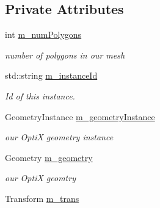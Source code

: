 \subsection*{Private Attributes}
\begin{DoxyCompactItemize}
\item 
\hypertarget{class_opti_x_model_ac229141f93d671f891f85ca5434ffcae}{int \hyperlink{class_opti_x_model_ac229141f93d671f891f85ca5434ffcae}{m\-\_\-num\-Polygons}}\label{class_opti_x_model_ac229141f93d671f891f85ca5434ffcae}

\begin{DoxyCompactList}\small\item\em number of polygons in our mesh \end{DoxyCompactList}\item 
\hypertarget{class_opti_x_model_ad813ee22588786e7344b4f522c646500}{std\-::string \hyperlink{class_opti_x_model_ad813ee22588786e7344b4f522c646500}{m\-\_\-instance\-Id}}\label{class_opti_x_model_ad813ee22588786e7344b4f522c646500}

\begin{DoxyCompactList}\small\item\em Id of this instance. \end{DoxyCompactList}\item 
\hypertarget{class_opti_x_model_a2d550524640b487d4e3e97b9ce0f327f}{Geometry\-Instance \hyperlink{class_opti_x_model_a2d550524640b487d4e3e97b9ce0f327f}{m\-\_\-geometry\-Instance}}\label{class_opti_x_model_a2d550524640b487d4e3e97b9ce0f327f}

\begin{DoxyCompactList}\small\item\em our Opti\-X geometry instance \end{DoxyCompactList}\item 
\hypertarget{class_opti_x_model_aad478427dc6e2b94277ea2fadeeb1883}{Geometry \hyperlink{class_opti_x_model_aad478427dc6e2b94277ea2fadeeb1883}{m\-\_\-geometry}}\label{class_opti_x_model_aad478427dc6e2b94277ea2fadeeb1883}

\begin{DoxyCompactList}\small\item\em our Opti\-X geomtry \end{DoxyCompactList}\item 
\hypertarget{class_opti_x_model_aef194c31844edeb16603167668a791dd}{Transform \hyperlink{class_opti_x_model_aef194c31844edeb16603167668a791dd}{m\-\_\-trans}}\label{class_opti_x_model_aef194c31844edeb16603167668a791dd}


\end{DoxyCompactItemize}
